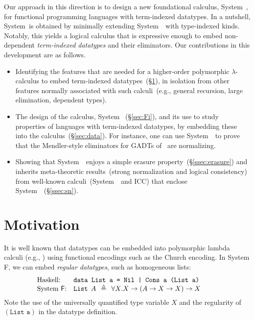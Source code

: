 Our approach in this direction is to design a new foundational calculus,
System~\Fi, for functional programming languages with term-indexed
datatypes.  In a nutshell, System~\Fi is obtained by minimally extending
System~\Fw\ with type-indexed kinds.  Notably, this yields a logical
calculus that is expressive enough to embed non-dependent
\emph{term-indexed datatypes} and their eliminators. Our contributions in
this development are as follows.\vspace*{-5pt}
\begin{itemize}
\item 
  Identifying the features that are needed for a higher-order polymorphic
  $\lambda$-calculus to embed term-indexed datatypes~(\S\ref{sec:motiv}),
  in isolation from other features normally associated with such
  calculi~(e.g., general recursion, large elimination, dependent types).
  \vspace*{-1pt}
\item 
  The design of the calculus, System \Fi\ (\S\ref{sec:Fi}), and its use to
  study properties of languages with term-indexed datatypes, by embedding
  these into the calculus~(\S\ref{sec:data}).  For instance, one can use
  System~\Fi\ to prove that the Mendler-style eliminators
  for GADTs of~\cite{AhnShe11} are normalizing.
  \vspace*{-1pt}
\item 
  Showing that System~\Fi\ enjoys a simple erasure
  property~(\S\ref{ssec:erasure}) and inherits meta-theoretic
  results~(strong normalization and logical consistency) from well-known
  calculi~(System~\Fw\ and ICC) that enclose System~\Fi~(\S\ref{ssec:sn}).
\end{itemize}\vspace*{-3pt}


\section{Motivation}
\label{sec:motiv}
It is well known that datatypes can be embedded into polymorphic lambda calculi
(e.g., \cite{AbeMatUus03}) using
functional encodings such as the Church encoding.
In System \textsf{F}, we can embed \emph{regular datatypes},
such as homogeneous lists:
\[\!\!\!\!\!\!\!\!\!
\begin{array}{ll}
\text{Haskell:} & \texttt{data List a = Nil | Cons a (List a)} \\
\text{System \textsf{F}:} & \texttt{{List}}\:\: A\:\:\triangleq\:\:\forall X.X\to(A\to X\to X)\to X ~~\;
\end{array}
\]
Note the use of the universally quantified type variable $X$
and the regularity of $(\texttt{List a})$ in the datatype definition.

